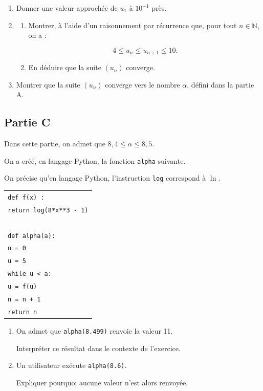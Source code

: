 \medskip

\begin{enumerate}
\item Donner une valeur approchée de $u_1$ à $10^{-1}$ près.
\item[2.] 
	\begin{enumerate}[label=\alph*.]
		\item Montrer, à l'aide d'un raisonnement par récurrence que, pour tout $n \in \mathbb{N}$, on a :
		
\[4 \leqslant u_n \leqslant u_{n+1} \leqslant 10.\]
		\item En déduire que la suite $(u_n)$ converge.
	\end{enumerate}
\item[3.] Montrer que la suite $(u_n)$ converge vers le nombre $\alpha$, défini dans la partie A.
\end{enumerate}

\subsection*{Partie C}

Dans cette partie, on admet que $8{,}4 \leqslant \alpha \leqslant 8{,}5$.

On a créé, en langage Python, la fonction \texttt{alpha} suivante.

On précise qu'en langage Python, l'instruction \texttt{log} correspond à $\ln$.


\begin{center}
\begin{tabular}{|l|}\hline
\texttt{def f(x) :}\\
\quad \texttt{return log(8*x**3 - 1)}\\
~\\
\texttt{def alpha(a):}\\
\quad \texttt{n = 0}\\
\quad \texttt{u = 5}\\
\quad \texttt{while u < a:}\\
\quad \quad \texttt{u = f(u)}\\
\quad \quad \texttt{n = n + 1}\\
\quad \texttt{return n}\\ \hline
\end{tabular}
\end{center}


\medskip

\begin{enumerate}
\item On admet que \texttt{alpha(8.499)} renvoie la valeur 11.

Interpréter ce résultat dans le contexte de l'exercice.
\item Un utilisateur exécute \texttt{alpha(8.6)}.

Expliquer pourquoi aucune valeur n'est alors renvoyée.
\end{enumerate}

\bigskip

